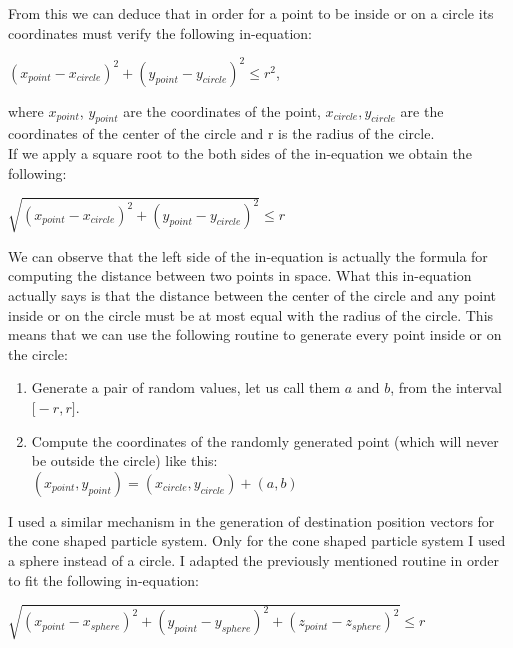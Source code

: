 From this we can deduce that in order for a point to be inside or on a circle its coordinates must verify the following in-equation:

\begin{center}
	$(x_{point} - x_{circle}) ^ 2 + (y_{point} - y_{circle}) ^ 2 \le r ^ 2$,
\end{center}
where $x_{point}$, $y_{point}$ are the coordinates of the point, $x_{circle}, y_{circle}$ are the coordinates of the center of the circle and r is the radius of the circle.\\

\newpage
If we apply a square root to the both sides of the in-equation we obtain the following:

\begin{center}
	$\sqrt{(x_{point} - x_{circle}) ^ 2 + (y_{point} - y_{circle}) ^ 2} \le r$
\end{center}

We can observe that the left side of the in-equation is actually the formula for computing the distance between two points in space. What this in-equation actually says is that the distance between the center of the circle and any point inside or on the circle must be at most equal with the radius of the circle. This means that we can use the following routine to generate every point inside or on the circle:

\begin{enumerate}
	\item Generate a pair of random values, let us call them $a$ and $b$, from the interval $\big[-r, r\big]$.
	
	\item Compute the coordinates of the randomly generated point (which will never be outside the circle) like this:\\
	$(x_{point}, y_{point}) = (x_{circle}, y_{circle}) + (a, b)$
\end{enumerate}

I used a similar mechanism in the generation of destination position vectors for the cone shaped particle system. Only for the cone shaped particle system I used a sphere instead of a circle. I adapted the previously mentioned routine in order to fit the following in-equation:

\begin{center}
	$\sqrt{(x_{point} - x_{sphere}) ^ 2 + (y_{point} - y_{sphere}) ^ 2 + (z_{point} - z_{sphere}) ^ 2} \le r$
\end{center}